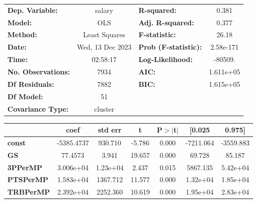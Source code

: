\begin{center}
\begin{tabular}{lclc}
\toprule
\textbf{Dep. Variable:}       &      salary      & \textbf{  R-squared:         } &     0.381   \\
\textbf{Model:}               &       OLS        & \textbf{  Adj. R-squared:    } &     0.377   \\
\textbf{Method:}              &  Least Squares   & \textbf{  F-statistic:       } &     26.18   \\
\textbf{Date:}                & Wed, 13 Dec 2023 & \textbf{  Prob (F-statistic):} & 2.58e-171   \\
\textbf{Time:}                &     02:58:17     & \textbf{  Log-Likelihood:    } &   -80509.   \\
\textbf{No. Observations:}    &        7934      & \textbf{  AIC:               } & 1.611e+05   \\
\textbf{Df Residuals:}        &        7882      & \textbf{  BIC:               } & 1.615e+05   \\
\textbf{Df Model:}            &          51      & \textbf{                     } &             \\
\textbf{Covariance Type:}     &     cluster      & \textbf{                     } &             \\
\bottomrule
\end{tabular}
\begin{tabular}{lcccccc}
                              & \textbf{coef} & \textbf{std err} & \textbf{t} & \textbf{P$> |$t$|$} & \textbf{[0.025} & \textbf{0.975]}  \\
\midrule
\textbf{const}                &   -5385.4737  &      930.710     &    -5.786  &         0.000        &    -7211.064    &    -3559.883     \\
\textbf{GS}                   &      77.4573  &        3.941     &    19.657  &         0.000        &       69.728    &       85.187     \\
\textbf{3PPerMP}              &    3.006e+04  &     1.23e+04     &     2.437  &         0.015        &     5867.135    &     5.42e+04     \\
\textbf{PTSPerMP}             &    1.583e+04  &     1367.712     &    11.577  &         0.000        &     1.32e+04    &     1.85e+04     \\
\textbf{TRBPerMP}             &    2.392e+04  &     2252.360     &    10.619  &         0.000        &     1.95e+04    &     2.83e+04     \\

\end{tabular}
\end{center}
